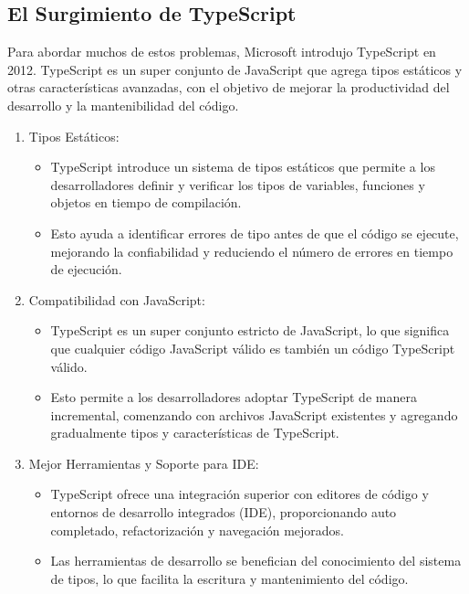 \documentclass{article}
\begin{document}
\subsection{ El Surgimiento de TypeScript}

Para abordar muchos de estos problemas, Microsoft introdujo TypeScript en 2012. TypeScript es un super conjunto de
JavaScript que agrega tipos estáticos y otras características avanzadas, con el objetivo de mejorar la productividad
del desarrollo y la mantenibilidad del código.

\begin{enumerate}
      \item Tipos Estáticos:
            \begin{itemize}
                  \item TypeScript introduce un sistema de tipos estáticos que permite a los desarrolladores definir y
                        verificar los tipos de variables, funciones y objetos en tiempo de compilación.
                  \item Esto ayuda a identificar errores de tipo antes de que el código se ejecute, mejorando la
                        confiabilidad y reduciendo el número de errores en tiempo de ejecución.
            \end{itemize}
      \item Compatibilidad con JavaScript:
            \begin{itemize}
                  \item TypeScript es un super conjunto estricto de JavaScript, lo que significa que cualquier código
                        JavaScript válido es también un código TypeScript válido.
                  \item Esto permite a los desarrolladores adoptar TypeScript de manera incremental, comenzando con
                        archivos JavaScript existentes y agregando gradualmente tipos y características de TypeScript.
            \end{itemize}

      \item Mejor Herramientas y Soporte para IDE:
            \begin{itemize}
                  \item TypeScript ofrece una integración superior con editores de código y entornos de desarrollo
                        integrados (IDE), proporcionando auto completado, refactorización y navegación mejorados.
                  \item Las herramientas de desarrollo se benefician del conocimiento del sistema de tipos, lo que
                        facilita la escritura y mantenimiento del código.
            \end{itemize}


\end{enumerate}
\end{document}
